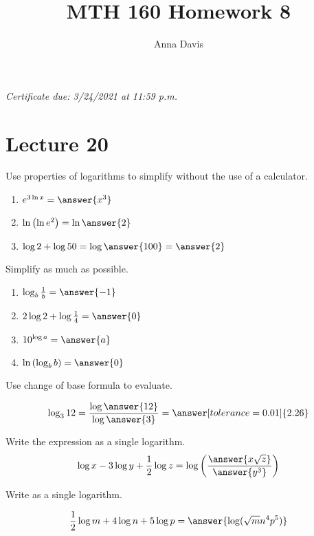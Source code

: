\documentclass{ximera}
\author{Anna Davis} \title{MTH 160 Homework 8}
\begin{document}
\begin{abstract}

\end{abstract}
\maketitle
 \textit{Certificate due: 3/24/2021 at 11:59 p.m.}
 \section{Lecture 20}
 
  \begin{problem}\label{prob:160hom8prob1} 
Use properties of logarithms to simplify without the use of a calculator.
\begin{enumerate}
    \item $e^{3\ln x}=\answer{x^3}$
    \item $\ln\left(\ln e^2\right)=\ln\answer{2}$
    \item $\log 2 +\log 50=\log \answer{100}=\answer{2}$
\end{enumerate}
\end{problem}

\begin{problem}\label{prob:160hom8prob8}
 Simplify as much as possible.
 \begin{enumerate}
     \item $\log_b \frac{1}{b}=\answer{-1}$
     \item $2\log 2+\log\frac{1}{4}=\answer{0}$
     \item $10^{\log a}=\answer{a}$
     \item $\ln\left(\log_b b\right)=\answer{0}$
 \end{enumerate}
 \end{problem}

\begin{problem}\label{prob:160hom8prob2}
Use change of base formula to evaluate. 

$$\log_3 12=\frac{\log\answer{12}}{\log\answer{3}}=\answer[tolerance=0.01]{2.26}$$
\end{problem}

\begin{problem}\label{prob:160hom8prob3}
Write the expression as a single logarithm.
$$\log x-3\log y+\frac{1}{2}\log z=\log\left(\frac{\answer{x\sqrt{z}}}{\answer{y^3}}\right)$$
\end{problem}

\begin{problem}\label{prob:160hom8prob10}
 Write as a single logarithm.
 
 $$\frac{1}{2}\log m+4\log n+5\log p=\answer{\log(\sqrt{m}n^4p^5)}$$
 \end{problem}
 
\end{document}
